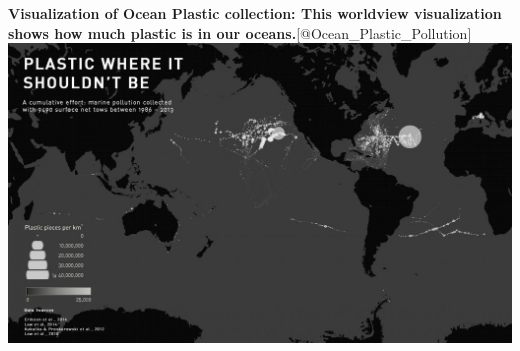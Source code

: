 \documentclass[]{book}
\theoremstyle{definition}
\theoremstyle{definition}
\theoremstyle{definition}
\theoremstyle{remark}
\begin{document}
\textbf{Visualization of Ocean Plastic collection: This worldview
visualization shows how much plastic is in our
oceans.}{[}@Ocean\_Plastic\_Pollution{]}
\includegraphics{images/Ocean_Plasticpollution.jpg}
\end{document}
